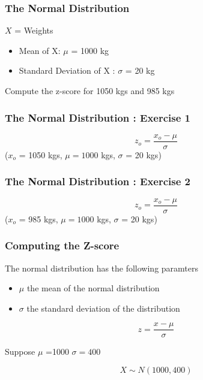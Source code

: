 \documentclass[IntroMain.tex]{subfiles}
\begin{document}

\begin{frame}
\frametitle{The Normal Distribution}

{\Large

$X$ = Weights
\bigskip
\begin{itemize}
\item Mean of X:  $\mu$ = 1000 kg 
\item Standard Deviation of X : $\sigma$ = 20 kg
\end{itemize}
\bigskip
}
{\LARGE
Compute the z-score for 1050 kgs and 985 kgs

}
\end{frame}

\begin{frame}
\frametitle{The Normal Distribution :  Exercise 1}
{\LARGE

\vspace{-2.9cm}
\[ z_o = \frac{x_o - \mu}{\sigma}  \]
($x_o$ = 1050 kgs, $\mu = 1000$ kgs, $\sigma$ = 20 kgs)

}
\end{frame}

\begin{frame}
\frametitle{The Normal Distribution :  Exercise 2}
{\LARGE

\vspace{-2.9cm}
\[ z_o = \frac{x_o - \mu}{\sigma}  \]
($x_o$ = 985 kgs, $\mu = 1000$ kgs, $\sigma$ = 20 kgs)





}
\end{frame}
\begin{frame}
\frametitle{Computing the Z-score}
The normal distribution has the following paramters

\begin{itemize}
	\item $\mu$ the mean of the normal distribution
	\item $\sigma$ the standard deviation of the distribution
\end{itemize}


\[z = \frac{x - \mu}{ \sigma}\]

Suppose $ \mu$ =1000
$\sigma=400$

\[ X \sim N(1000,400) \]


\end{frame}
\end{document}
